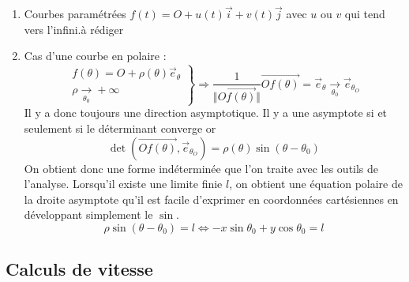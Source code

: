 \begin{exples}
\begin{enumerate}
 \item Courbes paramétrées $f(t)=O+u(t)\overrightarrow i +v(t)\overrightarrow j$ avec $u$ ou $v$ qui tend vers l'infini.à rédiger
 \item Cas d'une courbe en polaire : 
\begin{displaymath}
\left. 
\begin{aligned}
 f(\theta)=O+\rho(\theta)\overrightarrow{e}_{\theta}\\
\rho \xrightarrow[\theta_0]{} +\infty
\end{aligned}
\right\rbrace 
\Rightarrow \frac{1}{\Vert\overrightarrow{Of(\theta)} \Vert}\overrightarrow{Of(\theta)} = \overrightarrow{e}_{\theta} 
\xrightarrow[\theta_0]{} \overrightarrow{e}_{\theta_O}
\end{displaymath}
Il y a donc toujours une direction asymptotique. Il y a une asymptote si et seulement si le déterminant converge or
\begin{displaymath}
 \det(\overrightarrow{Of(\theta)},\overrightarrow{e}_{\theta_O}) = \rho(\theta)\sin(\theta - \theta_0)
\end{displaymath}
On obtient donc une forme indéterminée que l'on traite avec les outils de l'analyse. Lorsqu'il existe une limite finie $l$, on obtient une équation polaire de la droite asymptote qu'il est facile d'exprimer en coordonnées cartésiennes en développant simplement le $\sin$.
\begin{displaymath}
 \rho \sin(\theta -\theta_0) = l
\Leftrightarrow
-x\sin\theta_0 + y\cos\theta_0 = l
\end{displaymath}
\end{enumerate}
\end{exples}

\subsection{Calculs de vitesse}
